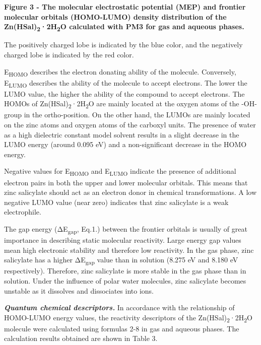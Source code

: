{\bfseries Figure 3 - The molecular electrostatic potential (MEP) and
frontier molecular orbitals (HOMO-LUMO) density distribution of the
Zn(HSal)\textsubscript{2}·2H\textsubscript{2}O calculated with PM3 for
gas and aqueous phases.}

The positively charged lobe is indicated by the blue color, and the
negatively charged lobe is indicated by the red color.

E\textsubscript{HOMO} describes the electron donating ability of the
molecule. Conversely, E\textsubscript{LUMO} describes the ability of the
molecule to accept electrons. The lower the LUMO value, the higher the
ability of the compound to accept electrons. The HOMOs of
Zn(HSal)\textsubscript{2}·2H\textsubscript{2}O are mainly located at the
oxygen atoms of the -OH-group in the ortho-position. On the other hand,
the LUMOs are mainly located on the zinc atoms and oxygen atoms of the
carboxyl units. The presence of water as a high dielectric constant
model solvent results in a slight decrease in the LUMO energy (around
0.095 eV) and a non-significant decrease in the HOMO energy.

Negative values for E\textsubscript{HOMO} and E\textsubscript{LUMO}
indicate the presence of additional electron pairs in both the upper and
lower molecular orbitals. This means that zinc salicylate should act as
an electron donor in chemical transformations. A low negative LUMO value
(near zero) indicates that zinc salicylate is a weak electrophile.

The gap energy (ΔE\textsubscript{gap}, Eq.1.) between the frontier
orbitals is usually of great importance in describing static molecular
reactivity. Large energy gap values \hspace{0pt}\hspace{0pt}mean high
electronic stability and therefore low reactivity. In the gas phase,
zinc salicylate has a higher ΔE\textsubscript{gap} value than in
solution (8.275 eV and 8.180 eV respectively). Therefore, zinc
salicylate is more stable in the gas phase than in solution. Under the
influence of polar water molecules, zinc salicylate becomes unstable as
it dissolves and dissociates into ions.

{\bfseries \emph{Quantum chemical descriptors.}} In accordance with the
relationship of HOMO-LUMO energy values, the reactivity descriptors of
the Zn(HSal)\textsubscript{2}·2H\textsubscript{2}O molecule were
calculated using formulas 2-8 in gas and aqueous phases. The calculation
results obtained are shown in Table 3.

